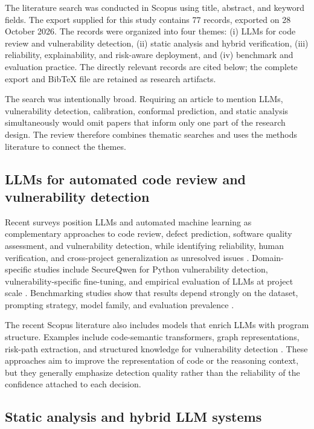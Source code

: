 \documentclass[pdflatex,sn-mathphys-num]{sn-jnl}
\begin{document}
The literature search was conducted in Scopus using title, abstract, and keyword fields. The export supplied for this study contains 77 records, exported on 28 October 2026. The records were organized into four themes: (i) LLMs for code review and vulnerability detection, (ii) static analysis and hybrid verification, (iii) reliability, explainability, and risk-aware deployment, and (iv) benchmark and evaluation practice. The directly relevant records are cited below; the complete export and BibTeX file are retained as research artifacts.

The search was intentionally broad. Requiring an article to mention LLMs, vulnerability detection, calibration, conformal prediction, and static analysis simultaneously would omit papers that inform only one part of the research design. The review therefore combines thematic searches and uses the methods literature to connect the themes.

\subsection{LLMs for automated code review and vulnerability detection}

Recent surveys position LLMs and automated machine learning as complementary approaches to code review, defect prediction, software quality assessment, and vulnerability detection, while identifying reliability, human verification, and cross-project generalization as unresolved issues \cite{Borgalli2026,Jelodar2026}. Domain-specific studies include SecureQwen for Python vulnerability detection, vulnerability-specific fine-tuning, and empirical evaluation of LLMs at project scale \cite{Mechri2025,Li2026}. Benchmarking studies show that results depend strongly on the dataset, prompting strategy, model family, and evaluation prevalence \cite{Tamberg202529698,Gnieciak2025198410}.

The recent Scopus literature also includes models that enrich LLMs with program structure. Examples include code-semantic transformers, graph representations, risk-path extraction, and structured knowledge for vulnerability detection \cite{Wei20262204,Dong20261,Feng2026,Liao202636005}. These approaches aim to improve the representation of code or the reasoning context, but they generally emphasize detection quality rather than the reliability of the confidence attached to each decision.

\subsection{Static analysis and hybrid LLM systems}
\end{document}
